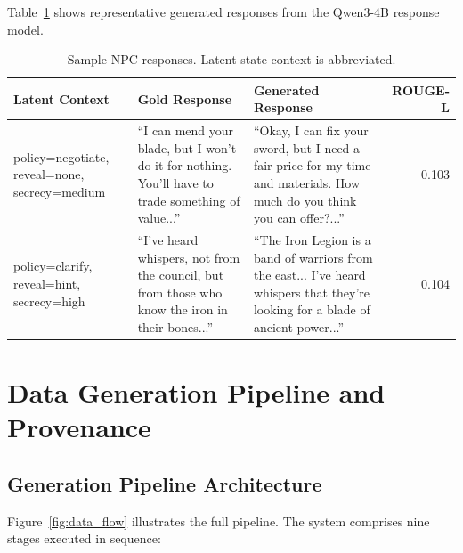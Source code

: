 \documentclass[11pt]{article}
\begin{document}
Table~\ref{tab:samples} shows representative generated responses from the Qwen3-4B response model.

\begin{table}[tp]
\centering
\caption{Sample NPC responses. Latent state context is abbreviated.}
\label{tab:samples}
\footnotesize\setlength{\tabcolsep}{2pt}
\begin{tabular}{@{}p{3.8cm}p{5.2cm}p{5.2cm}r@{}}
\toprule
\textbf{Latent Context} & \textbf{Gold Response} & \textbf{Generated Response} & \textbf{ROUGE-L} \\
\midrule
policy=negotiate, reveal=none, secrecy=medium &
``I can mend your blade, but I won't do it for nothing. You'll have to trade something of value...'' &
``Okay, I can fix your sword, but I need a fair price for my time and materials. How much do you think you can offer?...'' &
0.103 \\
\midrule
policy=clarify, reveal=hint, secrecy=high &
``I've heard whispers, not from the council, but from those who know the iron in their bones...'' &
``The Iron Legion is a band of warriors from the east... I've heard whispers that they're looking for a blade of ancient power...'' &
0.104 \\
\bottomrule
\end{tabular}
\end{table}

\section{Data Generation Pipeline and Provenance}
\label{app:datagen}

\subsection{Generation Pipeline Architecture}

Figure~\ref{fig:data_flow} illustrates the full pipeline.
The system comprises nine stages executed in sequence:
\end{document}
